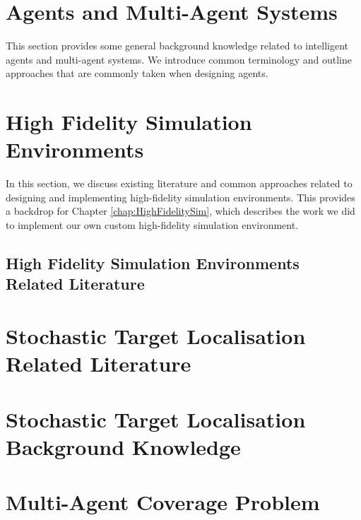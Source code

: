 \section{Agents and Multi-Agent Systems}
This section provides some general background knowledge related to intelligent agents and multi-agent systems. We introduce common terminology and outline approaches that are commonly taken when designing agents.


\section{High Fidelity Simulation Environments}
In this section, we discuss existing literature and common approaches related to designing and implementing high-fidelity simulation environments. This provides a backdrop for Chapter \ref{chap:HighFidelitySim}, which describes the work we did to implement our own custom high-fidelity simulation environment.
\subsection{High Fidelity Simulation Environments Related Literature}\label{sec:SimulationEnvironmentsRelatedLiterature}


\section{Stochastic Target Localisation Related Literature}\label{sec:StochasticTargetLocalisationRelatedLiterature}


\section{Stochastic Target Localisation Background Knowledge}\label{sec:StochasticTargetLocalizationBackground}


\section{Multi-Agent Coverage Problem}




